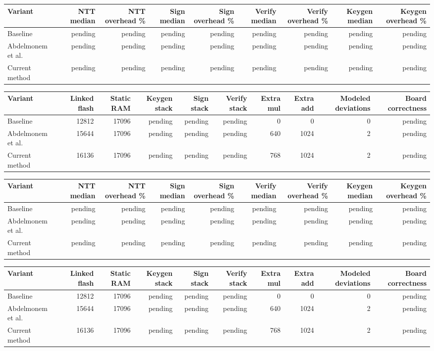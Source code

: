 
\begin{tabular}{lrrrrrrrr}
\hline
Variant & NTT median & NTT overhead \% & Sign median & Sign overhead \% & Verify median & Verify overhead \% & Keygen median & Keygen overhead \% \\
\hline
Baseline & pending & pending & pending & pending & pending & pending & pending & pending \\
Abdelmonem et al. & pending & pending & pending & pending & pending & pending & pending & pending \\
Current method & pending & pending & pending & pending & pending & pending & pending & pending \\
\hline
\end{tabular}

\begin{tabular}{lrrrrrrrrr}
\hline
Variant & Linked flash & Static RAM & Keygen stack & Sign stack & Verify stack & Extra mul & Extra add & Modeled deviations & Board correctness \\
\hline
Baseline & 12812 & 17096 & pending & pending & pending & 0 & 0 & 0 & pending \\
Abdelmonem et al. & 15644 & 17096 & pending & pending & pending & 640 & 1024 & 2 & pending \\
Current method & 16136 & 17096 & pending & pending & pending & 768 & 1024 & 2 & pending \\
\hline
\end{tabular}

\begin{tabular}{lrrrrrrrr}
\hline
Variant & NTT median & NTT overhead \% & Sign median & Sign overhead \% & Verify median & Verify overhead \% & Keygen median & Keygen overhead \% \\
\hline
Baseline & pending & pending & pending & pending & pending & pending & pending & pending \\
Abdelmonem et al. & pending & pending & pending & pending & pending & pending & pending & pending \\
Current method & pending & pending & pending & pending & pending & pending & pending & pending \\
\hline
\end{tabular}

\begin{tabular}{lrrrrrrrrr}
\hline
Variant & Linked flash & Static RAM & Keygen stack & Sign stack & Verify stack & Extra mul & Extra add & Modeled deviations & Board correctness \\
\hline
Baseline & 12812 & 17096 & pending & pending & pending & 0 & 0 & 0 & pending \\
Abdelmonem et al. & 15644 & 17096 & pending & pending & pending & 640 & 1024 & 2 & pending \\
Current method & 16136 & 17096 & pending & pending & pending & 768 & 1024 & 2 & pending \\
\hline
\end{tabular}
